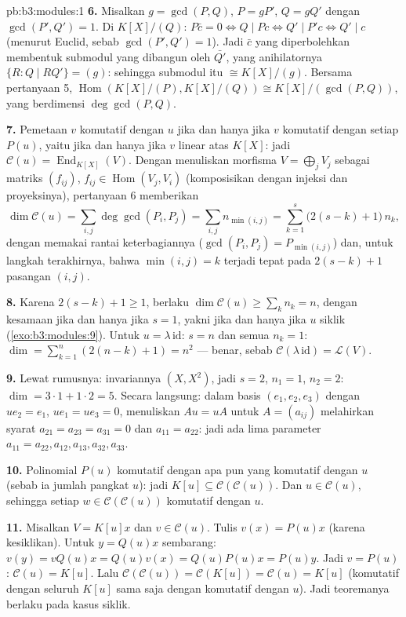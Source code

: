 \begin{solution}{pb:b3:modules:1}
\textbf{6.} Misalkan $g = \gcd(P, Q)$, $P = gP'$, $Q = gQ'$ dengan
$\gcd(P', Q') = 1$. Di $K[X]/(Q)$: $P\bar c = 0 \iff Q \mid Pc
\iff Q' \mid P'c \iff Q' \mid c$ (menurut Euclid, sebab $\gcd(P', Q') = 1$).
Jadi $\bar c$ yang diperbolehkan membentuk submodul yang dibangun oleh
$\bar{Q'}$, yang anihilatornya $\{R : Q \mid RQ'\} = (g)$:
sehingga submodul itu $\cong K[X]/(g)$. Bersama pertanyaan 5,
$\operatorname{Hom}(K[X]/(P), K[X]/(Q)) \cong K[X]/(\gcd(P,Q))$,
yang berdimensi $\deg\gcd(P,Q)$.

\textbf{7.} Pemetaan $v$ komutatif dengan $u$ jika dan hanya jika $v$ komutatif dengan setiap
$P(u)$, yaitu jika dan hanya jika $v$ linear atas $K[X]$: jadi $\mathcal C(u) =
\operatorname{End}_{K[X]}(V)$. Dengan menuliskan morfisma $V =
\bigoplus_j V_j$ sebagai matriks $(f_{ij})$, $f_{ij} \in
\operatorname{Hom}(V_j, V_i)$ (komposisikan dengan injeksi dan
proyeksinya), pertanyaan 6 memberikan
\[
\dim \mathcal C(u) = \sum_{i,j} \deg\gcd(P_i, P_j)
= \sum_{i,j} n_{\min(i,j)}
= \sum_{k=1}^{s} \bigl(2(s - k) + 1\bigr)\,n_k ,
\]
dengan memakai rantai keterbagiannya ($\gcd(P_i, P_j) =
P_{\min(i,j)}$) dan, untuk langkah terakhirnya, bahwa $\min(i,j) = k$
terjadi tepat pada $2(s - k) + 1$ pasangan $(i, j)$.

\textbf{8.} Karena $2(s-k)+1 \geq 1$, berlaku $\dim\mathcal C(u) \geq
\sum_k n_k = n$, dengan kesamaan jika dan hanya jika $s = 1$, yakni jika dan hanya jika $u$
siklik (\cref{exo:b3:modules:9}). Untuk $u = \lambda\,\mathrm{id}$:
$s = n$ dan semua $n_k = 1$: $\dim = \sum_{k=1}^n (2(n-k)+1) = n^2$
--- benar, sebab $\mathcal C(\lambda\,\mathrm{id}) = \mathcal
L(V)$.

\textbf{9.} Lewat rumusnya: invariannya $(X, X^2)$, jadi $s = 2$, $n_1 =
1$, $n_2 = 2$: $\dim = 3\cdot1 + 1\cdot2 = 5$. Secara langsung: dalam
basis $(e_1, e_2, e_3)$ dengan $u e_2 = e_1$, $ue_1 = ue_3 = 0$,
menuliskan $Au = uA$ untuk $A = (a_{ij})$ melahirkan syarat
$a_{21} = a_{23} = a_{31} = 0$ dan $a_{11} = a_{22}$: jadi ada lima
parameter  $a_{11}{=}a_{22}, a_{12}, a_{13}, a_{32}, a_{33}$.

\textbf{10.} Polinomial $P(u)$ komutatif dengan apa pun yang
komutatif dengan $u$ (sebab ia jumlah pangkat $u$): jadi $K[u]
\subseteq \mathcal C(\mathcal C(u))$. Dan $u \in \mathcal C(u)$,
sehingga setiap $w \in \mathcal C(\mathcal C(u))$ komutatif dengan $u$.

\textbf{11.} Misalkan $V = K[u]x$ dan $v \in \mathcal C(u)$. Tulis
$v(x) = P(u)x$ (karena kesiklikan). Untuk $y = Q(u)x$ sembarang: $v(y) =
vQ(u)x = Q(u)v(x) = Q(u)P(u)x = P(u)y$. Jadi $v = P(u)$: $\mathcal
C(u) = K[u]$. Lalu $\mathcal C(\mathcal C(u)) = \mathcal
C(K[u]) = \mathcal C(u) = K[u]$ (komutatif dengan seluruh $K[u]$ sama saja
dengan komutatif dengan $u$). Jadi teoremanya berlaku pada kasus
siklik.


\end{solution}
